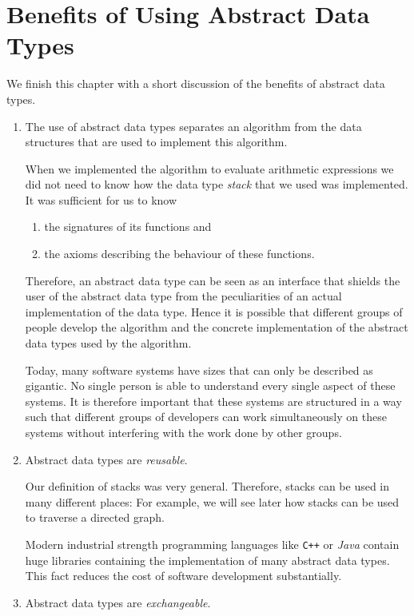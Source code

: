 \section[Benefits]{Benefits of Using Abstract Data Types}
We finish this chapter with a short discussion of the benefits of abstract data types.
 \begin{enumerate}
 \item The use of abstract data types separates an algorithm from the data structures that
       are used to implement this algorithm.

       When we implemented the algorithm to evaluate arithmetic expressions we did not need to know
       how the data type \emph{stack} that we used was implemented.  It was sufficient for us to know 
       \begin{enumerate}
       \item the signatures of its functions and
       \item the axioms describing the behaviour of these functions.
       \end{enumerate}
       Therefore, an abstract data type can be seen as an interface that shields the user of the
       abstract data type from the peculiarities of an actual implementation of the data type.
       Hence it is possible that different groups of people develop the algorithm and the
       concrete implementation of the abstract data types used by the algorithm.  

       Today, many software systems have sizes that can only be described as gigantic.  No single
       person is able to understand every single aspect of these systems.  It is therefore important
       that these systems are structured in a way such that different groups of developers can work
       simultaneously on these systems without interfering with the work done by other groups.
 \item Abstract data types are \emph{reusable}.

       Our definition of stacks was very general.  Therefore, stacks can be used in many different
       places:  For example, we will see later how stacks can be used to traverse a directed graph.

       Modern industrial strength programming languages like \texttt{C++} or \textsl{Java} contain
       huge libraries containing the implementation of many abstract data types.  This fact reduces
       the cost of software development substantially.     
 \item Abstract data types are \emph{exchangeable}.


\end{enumerate}
